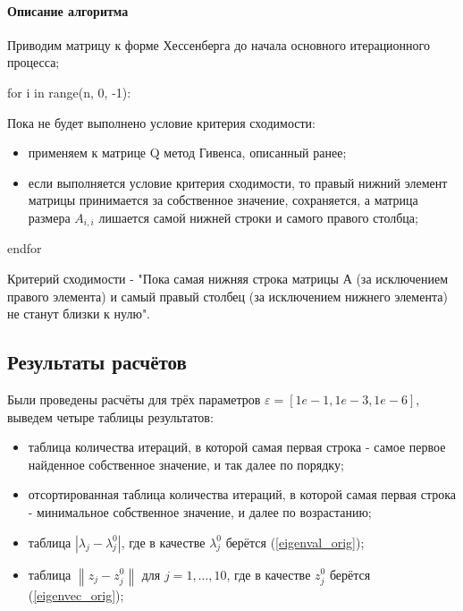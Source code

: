 \documentclass[a4paper]{article}
\begin{document}
\paragraph{Описание алгоритма}

Приводим матрицу к форме Хессенберга до начала основного итерационного процесса;

for i in range(n, 0, -1):

Пока не будет выполнено условие критерия сходимости:

\begin{itemize}
\item применяем к матрице Q метод Гивенса, описанный ранее;	
\item если выполняется условие критерия сходимости, то правый нижний элемент матрицы принимается за собственное значение, сохраняется, а матрица размера $A_{i, i}$ лишается самой нижней строки и самого правого столбца;
\end{itemize}
endfor

Критерий сходимости - "Пока самая нижняя строка матрицы А (за исключением правого элемента) и самый правый столбец (за исключением нижнего элемента) не станут близки к нулю".



\newpage

\subsection{Результаты расчётов}

Были проведены расчёты для трёх параметров $\varepsilon = [1e-1, 1e-3, 1e-6]$, выведем четыре таблицы результатов: 
\begin{itemize}
\item таблица количества итераций, в которой самая первая строка - самое первое найденное собственное значение, и так далее по порядку;
\item отсортированная таблица количества итераций, в которой самая первая строка - минимальное собственное значение, и далее по возрастанию;
\item таблица $\left | \lambda_j - \lambda_j^{0}  \right |$, где в качестве $\lambda_j^0$ берётся (\ref{eigenval_orig});
\item таблица $\left \| z_j - z_j^{0} \right \|$  для $j = 1,\ldots,10$, где в качестве $z_j^{0}$ берётся (\ref{eigenvec_orig});
\end{itemize}
\end{document}
